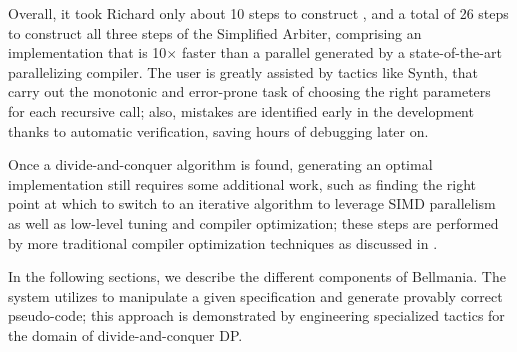 Overall, it took Richard only about 10 steps to construct ,
and a total of 26 steps to construct all three steps of the Simplified Arbiter,
comprising an implementation that is 10$\times$ faster than a parallel
 generated by a state-of-the-art parallelizing compiler.
The user is greatly assisted by tactics like {\sf Synth}, that carry out the monotonic
and error-prone task of choosing the right parameters for each recursive call; also,
mistakes are identified early in the development thanks to automatic verification,
saving hours of debugging later on.

Once a divide-and-conquer algorithm is found, generating an optimal implementation still requires some additional work, such as finding the right point at which to switch to an iterative algorithm to leverage SIMD parallelism as well as low-level tuning and compiler optimization;
these steps are performed by more traditional compiler optimization techniques
as discussed in .

In the following sections, we describe the different components of Bellmania. 
The system utilizes  to manipulate a given specification
and generate provably correct pseudo-code; 
this approach is demonstrated by engineering specialized tactics for the domain of divide-and-conquer DP.
